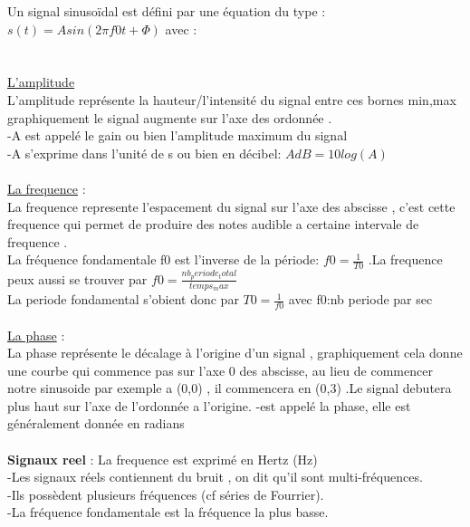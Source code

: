 \documentclass[a4paper,8pt,openany]{book}
\begin{document}
Un signal sinusoïdal est défini par une équation du type :\\
$s(t) = A sin(2\pi f0t + \Phi )$ avec :\\
\\
\\
\underline{L'amplitude}\\
L'amplitude repr\'esente la hauteur/l'intensit\'e du signal entre ces bornes min,max graphiquement le signal augmente sur l'axe des ordonn\'ee .\\
-A est appelé le gain ou bien l’amplitude maximum du signal\\
-A s’exprime dans l’unité de s ou bien en décibel: $A dB = 10 log(A)$\\
\\
\underline{La frequence} : \\
La frequence represente l'espacement du signal sur l'axe des abscisse , c'est cette frequence qui permet de produire des notes audible a certaine intervale de frequence .\\
La fréquence fondamentale f0 est l’inverse de la période: $f0=\frac{1}{T0}$ .La frequence peux aussi se trouver par  $f0=\frac{nb_periode_total}{temps_max}$\\
La periode fondamental s'obient donc par $T0=\frac{1}{f0}$ avec f0:nb periode par sec\\
\\
\underline{La phase} : \\
La phase représente le décalage à l’origine d’un signal , graphiquement cela donne une courbe qui commence pas sur l'axe 0 des abscisse, au lieu de commencer notre sinusoide par exemple a (0,0) , il commencera en (0,3) .Le signal debutera plus haut sur l'axe de l'ordonn\'ee a l'origine.
-\Phi est appelé la phase, elle est généralement donnée en radians\\
\\

\textbf{Signaux reel} : 
La frequence est exprim\'e en Hertz (Hz) \\
-Les signaux réels contiennent du bruit , on dit qu'il sont multi-fr\'equences.\\
-Ils possèdent plusieurs fréquences (cf séries de Fourrier).\\
-La fréquence fondamentale est la fréquence la plus basse.\\
\end{document}

